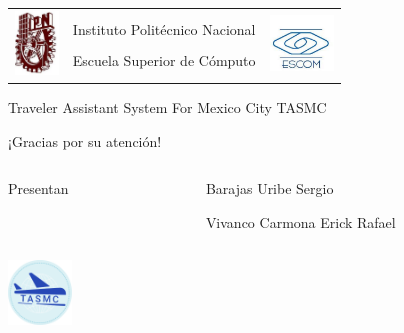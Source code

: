 \documentclass[12pt]{beamer}
\begin{document}
\begin{frame}
	\begin{center}
	\begin{minipage}[t]{0.73\textwidth}	
		\begin{tabular}{ccc}
			\multirow{4}{*}{\includegraphics[height=1.7cm]{imagenes/ipn.jpg}} &
			&
     	 	\multirow{4}{*}{\includegraphics[height=1.5cm]{imagenes/escom.jpg}} \\
      		& Instituto Politécnico Nacional & \\
      		& Escuela Superior de Cómputo & \\
      		&&\\
		\end{tabular}
	\end{minipage}
	\end{center}
	
	\begin{center}
		\textcolor[RGB]{0,0,204}{\Large Traveler Assistant System For Mexico City TASMC}
	\end{center}		
	
	\begin{center}
		\Large ¡Gracias por su atención!
	\end{center}
	
	\begin{columns} 
		\begin{column}{0.1cm}
			Presentan
		\end{column}
		\begin{column}{6cm} 
			Barajas Uribe Sergio

			Vivanco Carmona Erick Rafael
		\end{column} 
	\end{columns}	
	
		\begin{center}
		\includegraphics[height=1.7cm]{imagenes/logo.png}
	\end{center}		
\end{frame}
\end{document}
